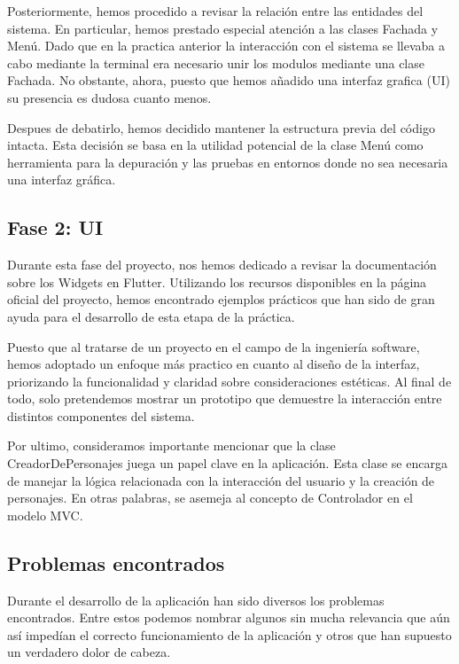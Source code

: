 \documentclass{article}
\begin{document}
Posteriormente, hemos procedido a revisar la relación entre las entidades del sistema. En particular, hemos prestado especial atención a las clases Fachada y Menú. Dado que en la practica anterior la interacción con el sistema se llevaba a cabo mediante la terminal
era necesario unir los modulos mediante una clase Fachada. No obstante, ahora, puesto que hemos añadido una interfaz grafica (UI) su presencia es dudosa cuanto menos. 

Despues de debatirlo, hemos decidido mantener la estructura previa del código intacta. Esta decisión se basa en la utilidad potencial de la clase Menú como herramienta para la depuración y las pruebas en entornos donde no sea necesaria una interfaz gráfica.


\subsection{Fase 2: UI}



Durante esta fase del proyecto, nos hemos dedicado a revisar la documentación sobre los Widgets en Flutter. Utilizando los recursos disponibles en la página oficial del proyecto, hemos encontrado ejemplos prácticos que han sido de gran ayuda para el desarrollo de esta etapa de la práctica.

Puesto que al tratarse de un proyecto en el campo de la ingeniería software, hemos adoptado un enfoque más practico en cuanto al diseño de la interfaz, priorizando la funcionalidad y claridad sobre consideraciones estéticas. Al final de todo, solo pretendemos mostrar un prototipo que demuestre la interacción entre distintos componentes del sistema.  

Por ultimo, consideramos importante mencionar que la clase CreadorDePersonajes juega un papel clave en la aplicación. Esta clase se encarga de manejar la lógica relacionada con la interacción del usuario y la creación de personajes. En otras palabras, se asemeja al concepto de Controlador en el modelo MVC. 

\subsection{Problemas encontrados}

Durante el desarrollo de la aplicación han sido diversos los problemas encontrados. Entre estos podemos nombrar algunos sin mucha relevancia que aún así impedían el correcto funcionamiento de la aplicación y otros que han supuesto un verdadero dolor de cabeza.
\end{document}
